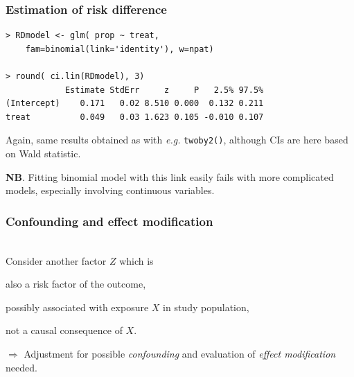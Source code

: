 \documentclass[handout,12pt]{beamer}
\begin{document}

\begin{frame}[fragile]
 \frametitle{Estimation of risk difference}

\small
\begin{verbatim}
> RDmodel <- glm( prop ~ treat, 
    fam=binomial(link='identity'), w=npat)
    
> round( ci.lin(RDmodel), 3)
            Estimate StdErr     z     P   2.5% 97.5%
(Intercept)    0.171   0.02 8.510 0.000  0.132 0.211
treat          0.049   0.03 1.623 0.105 -0.010 0.107
\end{verbatim}
 \normalsize
\bi 
\item Again, same results obtained as with 
{\it e.g.} {\tt twoby2()},
  although CIs are here based on Wald statistic.
\medskip
\item {\bf NB}. Fitting binomial model with this link 
easily fails with more complicated models, 
      especially involving continuous variables.
\ei
\end{frame}


\begin{frame}[fragile] \frametitle{Confounding and effect modification}
\ \\
Consider another {factor} $Z$ which is
\bi
\item also a risk factor of the outcome,
\item possibly associated with exposure $X$ in study population,
\item not a causal consequence of $X$.
\ei

$\Rightarrow$ Adjustment for possible {\it confounding} and evaluation of {\it effect modification} needed.
\end{frame} 

\end{document}
